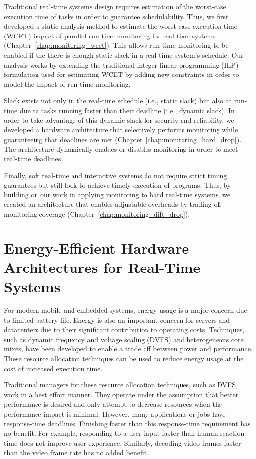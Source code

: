 Traditional real-time systems design requires estimation of the worst-case
execution time of tasks in order to guarantee schedulability. Thus, we first
developed a static analysis method to estimate the worst-case execution time
(WCET) impact of parallel run-time monitoring for real-time systems
(Chapter~\ref{chap:monitoring_wcet}). This allows run-time monitoring to be
enabled if the there is enough static slack in a real-time system's schedule.
Our analysis works by extending the traditional integer-linear programming
(ILP) formulation used for estimating WCET by adding new constraints in order
to model the impact of run-time monitoring.

Slack exists not only in the real-time schedule (i.e., static slack) but also
at run-time due to tasks running faster than their deadline (i.e., dynamic
slack). In order to take advantage of this dynamic slack for security and
reliability, we developed a hardware architecture that selectively performs
monitoring while guaranteeing that deadlines are met
(Chapter~\ref{chap:monitoring_hard_drop}). The architecture dynamically enables
or disables monitoring in order to meet real-time deadlines.

Finally, soft real-time and interactive systems do not require strict timing guarantees
but still look to achieve timely execution of programs. Thus, by building on
our work in applying monitoring to hard real-time systems, we created an
architecture that enables adjustable overheads by trading off monitoring coverage
(Chapter~\ref{chap:monitoring_dift_drop}). 

\section{Energy-Efficient Hardware Architectures for Real-Time Systems}
\label{sec:intro.energy}

For modern mobile and embedded systems, energy usage is a major concern due to
limited battery life. Energy is also an important concern for servers and
datacenters due to their significant contribution to operating costs.
Techniques, such as dynamic frequency and voltage scaling (DVFS) and
heterogeneous core mixes, have been developed to enable a trade off between
power and performance. These resource allocation techniques can be used to
reduce energy usage at the cost of increased execution time.

Traditional managers for these resource allocation techniques, such as DVFS,
work in a best effort manner. They operate under the assumption that better
performance is desired and only attempt to decrease resources when the
performance impact is minimal.  However, many applications or jobs have
response-time deadlines. Finishing faster than this response-time
requirement has no benefit. For example, responding to a user input faster than
human reaction time does not improve user experience. Similarly, decoding video
frames faster than the video frame rate has no added benefit. 

